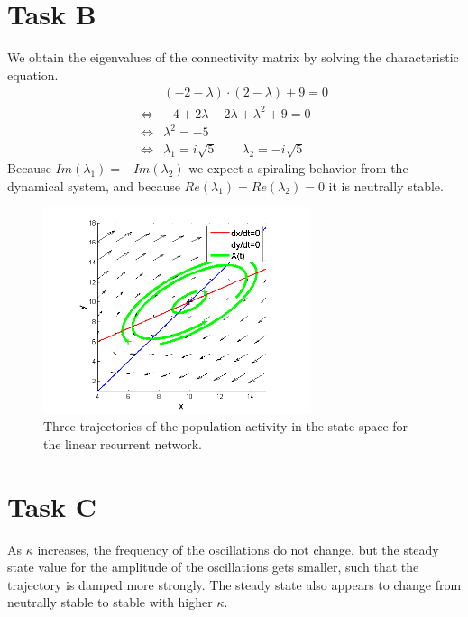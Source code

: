\documentclass{scrartcl}
\begin{document}
\section{Task B}

We obtain the eigenvalues of the connectivity matrix by solving the characteristic equation.
\begin{align*}
&(-2 - \lambda) \cdot (2 - \lambda) + 9 = 0 \\
\Leftrightarrow & -4 + 2\lambda - 2\lambda + \lambda^2 + 9 = 0 \\
\Leftrightarrow & \lambda^2 = -5 \\
\Leftrightarrow & \lambda_1 = i\sqrt{5} \qquad \lambda_2 = -i\sqrt{5} 
\end{align*}
Because $Im(\lambda_1) = - Im(\lambda_2)$ we expect a spiraling behavior from the dynamical system, and because $Re(\lambda_1) = Re(\lambda_2) = 0$ it is neutrally stable.

\begin{figure}
\centering
\includegraphics[trim = {1.3cm 0 0.5cm 0.2cm}, width=0.7\textwidth, clip]{../pics/traj}
\caption{Three trajectories of the population activity in the state space for the linear recurrent network.}
\label{label}
\end{figure}

\section{Task C}

As $\kappa$ increases, the frequency of the oscillations do not change, but the steady state value for the amplitude of the oscillations gets smaller, such that the trajectory is damped more strongly. The steady state also appears to change from neutrally stable to stable with higher $\kappa$.
\end{document}
